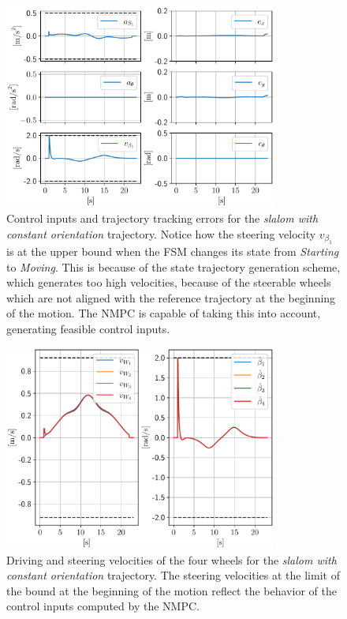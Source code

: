 \begin{figure}
    \centering
    \includegraphics[width=0.8\textwidth]{figures/SWMR/simulations/slalom_with_constant_orientation/inputs_and_errors.pdf}
    \caption{Control inputs and trajectory tracking errors for the
        \textit{slalom with constant orientation} trajectory. Notice how 
        the steering velocity $v_{\beta_1}$ is at the upper bound when 
        the FSM changes its state from \textit{Starting} to \textit{Moving}.
        This is because of the state trajectory generation scheme, which 
        generates too high velocities, because of the steerable wheels which
        are not aligned with the reference trajectory at the beginning of 
        the motion. The NMPC is capable of taking this into account, generating
        feasible control inputs.
    }
    \label{fig:simulations:slalom-with-constant-orientation:inputs-and-errors}
\end{figure}
\begin{figure}
    \centering
    \includegraphics[width=0.8\textwidth]{figures/SWMR/simulations/slalom_with_constant_orientation/wheels_velocities.pdf}
    \caption{Driving and steering velocities of the four wheels for the
        \textit{slalom with constant orientation} trajectory. The steering 
        velocities at the limit of the bound at the beginning of the motion 
        reflect the behavior of the control inputs computed by the NMPC.
    }
    \label{fig:simulations:slalom-with-constant-orientation:wheel-velocities}
\end{figure}

